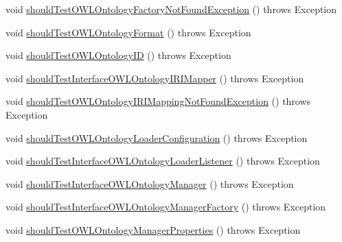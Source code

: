 \begin{DoxyCompactItemize}
\item 
void \hyperlink{classorg_1_1semanticweb_1_1owlapi_1_1contract_1_1_contract_owlapi_model__3_test_a3cb5f3f01de3830a93590ba548364fb3}{should\-Test\-O\-W\-L\-Ontology\-Factory\-Not\-Found\-Exception} ()  throws Exception 
\item 
void \hyperlink{classorg_1_1semanticweb_1_1owlapi_1_1contract_1_1_contract_owlapi_model__3_test_a9a504bd06b4caf4a1a378e11db32b490}{should\-Test\-O\-W\-L\-Ontology\-Format} ()  throws Exception 
\item 
void \hyperlink{classorg_1_1semanticweb_1_1owlapi_1_1contract_1_1_contract_owlapi_model__3_test_a4e4e50a64266a95cacd6617d83d13107}{should\-Test\-O\-W\-L\-Ontology\-I\-D} ()  throws Exception 
\item 
void \hyperlink{classorg_1_1semanticweb_1_1owlapi_1_1contract_1_1_contract_owlapi_model__3_test_a2a462a4b0e3f462cb2c458f359962072}{should\-Test\-Interface\-O\-W\-L\-Ontology\-I\-R\-I\-Mapper} ()  throws Exception 
\item 
void \hyperlink{classorg_1_1semanticweb_1_1owlapi_1_1contract_1_1_contract_owlapi_model__3_test_aa79f8a75659cdd6a835690e532e0f053}{should\-Test\-O\-W\-L\-Ontology\-I\-R\-I\-Mapping\-Not\-Found\-Exception} ()  throws Exception 
\item 
void \hyperlink{classorg_1_1semanticweb_1_1owlapi_1_1contract_1_1_contract_owlapi_model__3_test_ad10129e391c21fcf0381bdffd944d060}{should\-Test\-O\-W\-L\-Ontology\-Loader\-Configuration} ()  throws Exception 
\item 
void \hyperlink{classorg_1_1semanticweb_1_1owlapi_1_1contract_1_1_contract_owlapi_model__3_test_a3a64e9668bb00ce59d691952f9d6ebf4}{should\-Test\-Interface\-O\-W\-L\-Ontology\-Loader\-Listener} ()  throws Exception 
\item 
void \hyperlink{classorg_1_1semanticweb_1_1owlapi_1_1contract_1_1_contract_owlapi_model__3_test_ac7ec870d66d60339df11c775a9bb4cff}{should\-Test\-Interface\-O\-W\-L\-Ontology\-Manager} ()  throws Exception 
\item 
void \hyperlink{classorg_1_1semanticweb_1_1owlapi_1_1contract_1_1_contract_owlapi_model__3_test_a4a48d7b2cf88e38c38a2510433b8271d}{should\-Test\-Interface\-O\-W\-L\-Ontology\-Manager\-Factory} ()  throws Exception 
\item 
void \hyperlink{classorg_1_1semanticweb_1_1owlapi_1_1contract_1_1_contract_owlapi_model__3_test_a9e49cbaf292970fc87d0d2cae976c6c2}{should\-Test\-O\-W\-L\-Ontology\-Manager\-Properties} ()  throws Exception 
\item 

\end{DoxyCompactItemize}

